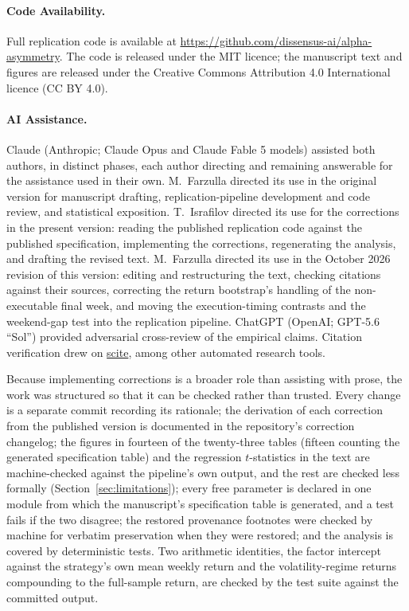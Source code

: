 \documentclass[11pt]{article}
\begin{document}
\paragraph{Code Availability.} Full replication code is available at \url{https://github.com/dissensus-ai/alpha-asymmetry}. The code is released under the MIT licence; the manuscript text and figures are released under the Creative Commons Attribution 4.0 International licence (CC BY 4.0).

\paragraph{AI Assistance.} Claude (Anthropic; Claude Opus and Claude Fable 5 models) assisted both authors, in distinct phases, each author directing and remaining answerable for the assistance used in their own. M.\ Farzulla directed its use in the original version for manuscript drafting, replication-pipeline development and code review, and statistical exposition. T.\ Israfilov directed its use for the corrections in the present version: reading the published replication code against the published specification, implementing the corrections, regenerating the analysis, and drafting the revised text. M.\ Farzulla directed its use in the October 2026 revision of this version: editing and restructuring the text, checking citations against their sources, correcting the return bootstrap's handling of the non-executable final week, and moving the execution-timing contrasts and the weekend-gap test into the replication pipeline. ChatGPT (OpenAI; GPT-5.6 ``Sol'') provided adversarial cross-review of the empirical claims. Citation verification drew on \href{https://scite.ai}{scite}, among other automated research tools.

Because implementing corrections is a broader role than assisting with prose, the work was structured so that it can be checked rather than trusted. Every change is a separate commit recording its rationale; the derivation of each correction from the published version is documented in the repository's correction changelog; the figures in fourteen of the twenty-three tables (fifteen counting the generated specification table) and the regression $t$-statistics in the text are machine-checked against the pipeline's own output, and the rest are checked less formally (Section~\ref{sec:limitations}); every free parameter is declared in one module from which the manuscript's specification table is generated, and a test fails if the two disagree; the restored provenance footnotes were checked by machine for verbatim preservation when they were restored; and the analysis is covered by deterministic tests. Two arithmetic identities, the factor intercept against the strategy's own mean weekly return and the volatility-regime returns compounding to the full-sample return, are checked by the test suite against the committed output.
\end{document}
